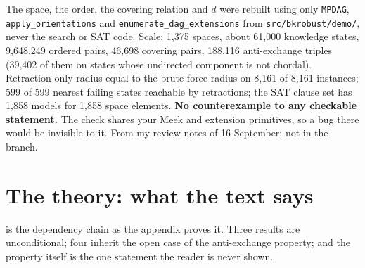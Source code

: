 \begin{medido}
The space, the order, the covering relation and $d$ were rebuilt using only \texttt{MPDAG},
\texttt{apply\_orientations} and \texttt{enumerate\_dag\_extensions} from \texttt{src/\allowbreak bkrobust/\allowbreak demo/\allowbreak },
never the search or SAT code. Scale: 1,375 spaces, about 61,000 knowledge states, 9,648,249 ordered
pairs, 46,698 covering pairs, 188,116 anti-exchange triples (39,402 of them on states whose undirected
component is not chordal). Retraction-only radius equal to the brute-force radius on 8,161 of 8,161
instances; 599 of 599 nearest failing states reachable by retractions; the SAT clause set has 1,858
models for 1,858 space elements. \textbf{No counterexample to any checkable statement.} The check shares
your Meek and extension primitives, so a bug there would be invisible to it. From my review notes of 16
September; not in the branch.
\end{medido}

\begin{antes}
\end{antes}

\section{The theory: what the text says}

 is the dependency chain as the appendix proves it. Three results are
unconditional; four inherit the open case of the anti-exchange property; and the property itself is
the one statement the reader is never shown.

